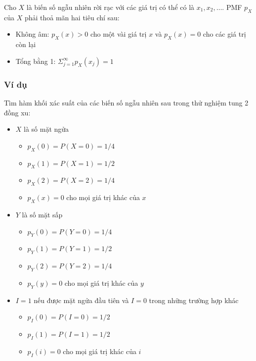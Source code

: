 \documentclass[
]{book}
\providecommand{\tightlist}{%
  \setlength{\itemsep}{0pt}\setlength{\parskip}{0pt}}
\begin{document}
Cho \(X\) là biến số ngẫu nhiên rời rạc với các giá trị có thể có là \(x_1, x_2, \ldots\). PMF \(p_X\) của \(X\) phải thoả mãn hai tiêu chí sau:

\begin{itemize}
\tightlist
\item
  Không âm: \(p_X(x) > 0\) cho một vài giá trị \(x\) và \(p_X(x) = 0\) cho các giá trị còn lại
\item
  Tổng bằng 1: \(\Sigma^\infty_{j = 1}p_X(x_j) = 1\)
\end{itemize}

\hypertarget{vuxed-dux1ee5-1}{%
\subsubsection{Ví dụ}\label{vuxed-dux1ee5-1}}

Tìm hàm khối xác suất của các biến số ngẫu nhiên sau trong thử nghiệm tung 2 đồng xu:

\begin{itemize}
\tightlist
\item
  \(X\) là số mặt ngửa

  \begin{itemize}
  \tightlist
  \item
    \(p_X(0) = P(X = 0) = 1/4\)
  \item
    \(p_X(1) = P(X = 1) = 1/2\)
  \item
    \(p_X(2) = P(X = 2) = 1/4\)
  \item
    \(p_X(x) = 0\) cho mọi giá trị khác của \(x\)
  \end{itemize}
\item
  \(Y\) là số mặt sấp

  \begin{itemize}
  \tightlist
  \item
    \(p_Y(0) = P(Y = 0) = 1/4\)
  \item
    \(p_Y(1) = P(Y = 1) = 1/2\)
  \item
    \(p_Y(2) = P(Y = 2) = 1/4\)
  \item
    \(p_Y(y) = 0\) cho mọi giá trị khác của \(y\)
  \end{itemize}
\item
  \(I = 1\) nếu được mặt ngửa đầu tiên và \(I = 0\) trong những trường hợp khác

  \begin{itemize}
  \tightlist
  \item
    \(p_I(0) = P(I = 0) = 1/2\)
  \item
    \(p_I(1) = P(I = 1) = 1/2\)
  \item
    \(p_I(i) = 0\) cho mọi giá trị khác của \(i\)
  \end{itemize}
\end{itemize}
\end{document}
